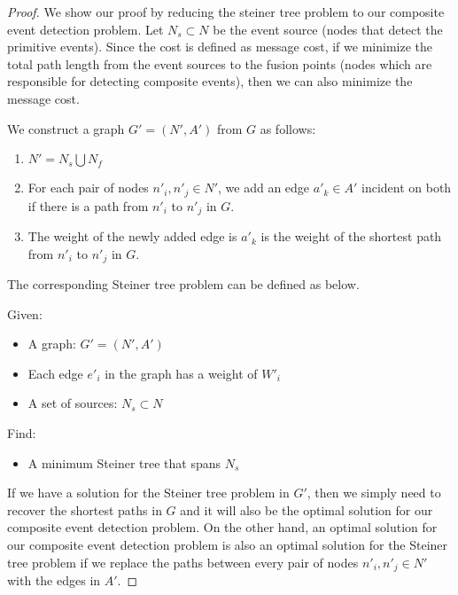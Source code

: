 \begin{proof}
We show our proof by reducing the steiner tree problem to our composite event detection problem. Let \(N_s\subset N\) be the event source (nodes that detect the primitive events). Since the cost is defined as message cost, if we minimize the total path length from the event sources to the fusion points (nodes which are responsible for detecting composite events), then we can also minimize the message cost.

We construct a graph \(G'=(N', A')\) from \(G\) as follows:
\begin{enumerate}
\item \(N'=N_s\bigcup N_f\)
\item For each pair of nodes \(n'_i, n'_j\in N'\), we add an edge \(a'_k\in A'\) incident on both if there is a path from \(n'_i\) to \(n'_j\) in \(G\).
\item The weight of the newly added edge is \(a'_k\) is the weight of the shortest path from \(n'_i\) to \(n'_j\) in \(G\).
\end{enumerate}

The corresponding Steiner tree problem can be defined as below.

Given:
\begin{itemize}
\item A graph: \(G'=(N', A')\)
\item Each edge \(e'_i\) in the graph has a weight of \(W'_i\)
\item A set of sources: \(N_s\subset N\)
\end{itemize}

Find:
\begin{itemize}
\item A minimum Steiner tree that spans \(N_s\)
\end{itemize}

If we have a solution for the Steiner tree problem in \(G'\), then we simply need to recover the shortest paths in \(G\) and it will also be the optimal solution for our composite event detection problem. On the other hand, an optimal solution for our composite event detection problem is also an optimal solution for the Steiner tree problem if we replace the paths between every pair of nodes \(n'_i, n'_j\in N'\)  with the edges in \(A'\).
\end{proof}
